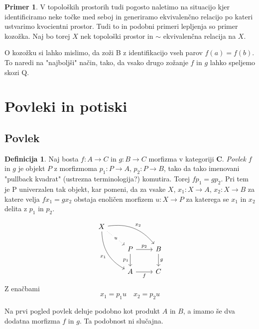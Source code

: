 \documentclass[12pt,a4paper]{book}
\theoremstyle{definition}
\newtheorem{definicija}{Definicija}[chapter]
\theoremstyle{plain}
\theoremstyle{definition}
\newtheorem{primer}{Primer}[section]
\theoremstyle{remark}
\newcommand{\cat}[1]{\textbf{#1}}
\begin{document}
\begin{primer}
V topoloških prostorih tudi pogosto naletimo na situacijo kjer identificiramo neke točke med seboj in generiramo ekvivalenčno relacijo po kateri ustvarimo kvocientni prostor. Tudi to in podobni primeri lepljenja so primer kozožka. Naj bo torej $X$ nek topološki prostor in $\sim$ ekvivalenčna relacija na $X$.
\end{primer}

O kozožku si lahko mislimo, da zoži B z identifikacijo vseh parov $f(a) = f(b)$. To naredi na "najboljši" način, tako, da vsako drugo zožanje $f$ in $g$ lahko speljemo skozi Q.


\section{Povleki in potiski}

\subsection{Povlek}

\begin{definicija}
Naj bosta $f : A \to C$ in $g : B \to C$ morfizma v kategoriji $\cat{C}$. \textit{Povlek} $f$ in $g$ je objekt $P$ z morfizmoma $p_1 : P \to A$, $p_2 : P \to B$, tako da tako imenovani "pullback kvadrat" (ustrezna terminologija?) komutira. Torej $fp_1 = gp_2$. Pri tem je P univerzalen tak objekt, kar pomeni, da za vsake $X$, $x_1 : X \to A$, $x_2 : X \to B$ za katere velja $fx_1 = gx_2$ obstaja enoličen morfizem $u : X \to P$ za katerega se $x_1$ in $x_2$ delita z $p_1$ in $p_2$.

$$\begin{tikzcd}
X
\arrow[drr, bend left, "x_2"]
\arrow[ddr, bend right, "x_1"']
\arrow[dr, dotted, "u" description] & & \\
& P \arrow[r, "p_2"] \arrow[d, "p_1"']
& B \arrow[d, "g"] \\
& A \arrow[r, "f"']
& C
\end{tikzcd}$$
Z enačbami
$$x_1 = p_1u \quad x_2 = p_2u$$
\end{definicija}

Na prvi pogled povlek deluje podobno kot produkt $A$ in $B$, a imamo še dva dodatna morfizma $f$ in $g$. Ta podobnost ni slučajna.
\end{document}
